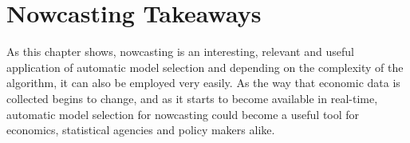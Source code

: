 


\section{Nowcasting Takeaways}

As this chapter shows, nowcasting is an interesting, relevant and useful application of automatic model selection and depending on the complexity of the algorithm, it can also be employed very easily. As the way that economic data is collected begins to change, and as it starts to become available in real-time, automatic model selection for nowcasting could become a  useful tool for economics, statistical agencies and policy makers alike.  